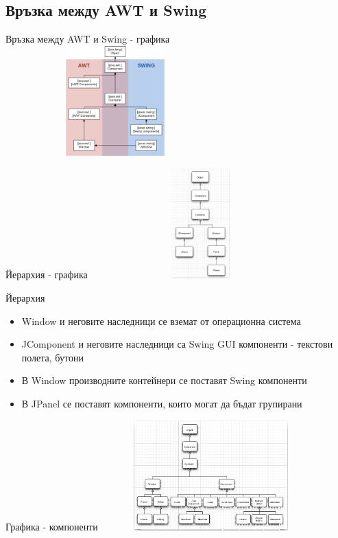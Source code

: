 \documentclass{beamer}
\begin{document}
\subsection{Връзка между AWT и Swing}
\begin{frame}{Връзка между AWT и Swing - графика}
  \transdissolve
  \includegraphics[width=320px,height=160px]{images/AWTSwingClassHierarchy.png}  
\end{frame}

\begin{frame}{Йерархия - графика}
  \transdissolve
  \includegraphics[width=320px,height=160px]{images/components.png}  
\end{frame}

\begin{frame}{Йерархия}
  \transdissolve
  \begin{itemize}
  \item Window и неговите наследници се вземат от операционна система
  \item JComponent и неговите наследници са Swing GUI компоненти -
    текстови полета, бутони
  \item В Window производните контейнери се поставят Swing компоненти
  \item В JPanel се поставят компоненти, които могат да бъдат групирани
  \end{itemize}
\end{frame}


\begin{frame}{Графика - компоненти}
  \transdissolve
  \includegraphics[width=320px,height=160px]{images/all_components.png}
\end{frame}
\end{document}
